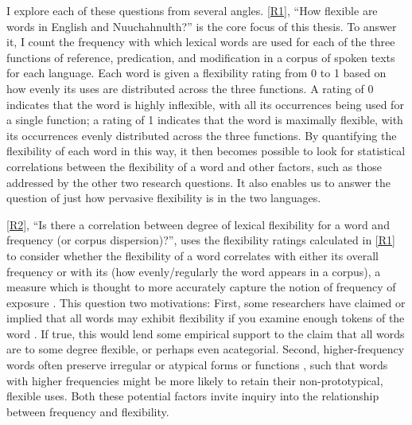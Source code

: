 I explore each of these questions from several angles. \ref{R1}, \enquote{How flexible are words in English and Nuuchahnulth?} is the core focus of this thesis. To answer it, I count the frequency with which lexical words are used for each of the three functions of reference, predication, and modification in a corpus of spoken texts for each language. Each word is given a flexibility rating from 0 to 1 based on how evenly its uses are distributed across the three functions. A rating of 0 indicates that the word is highly inflexible, with all its occurrences being used for a single function; a rating of 1 indicates that the word is maximally flexible, with its occurrences evenly distributed across the three functions. By quantifying the flexibility of each word in this way, it then becomes possible to look for statistical correlations between the flexibility of a word and other factors, such as those addressed by the other two research questions. It also enables us to answer the question of just how pervasive flexibility is in the two languages.

\ref{R2}, \enquote{Is there a correlation between degree of lexical flexibility for a word and frequency (or corpus dispersion)?}, uses the flexibility ratings calculated in \ref{R1} to consider whether the flexibility of a word correlates with either its overall frequency or with its  (how evenly/regularly the word appears in a corpus), a measure which is thought to more accurately capture the notion of frequency of exposure \parencites{Gries2008}{Griesforthcoming}. This question two motivations: First, some researchers have claimed or implied that all words may exhibit flexibility if you examine enough tokens of the word \parencite[77]{MoselHovdhaugen1992}. If true, this would lend some empirical support to the claim that all words are to some degree flexible, or perhaps even acategorial. Second, higher-frequency words often preserve irregular or atypical forms or functions \parencite[Ch.~13]{Bybee2007}, such that words with higher frequencies might be more likely to retain their non-prototypical, flexible uses. Both these potential factors invite inquiry into the relationship between frequency and flexibility.

